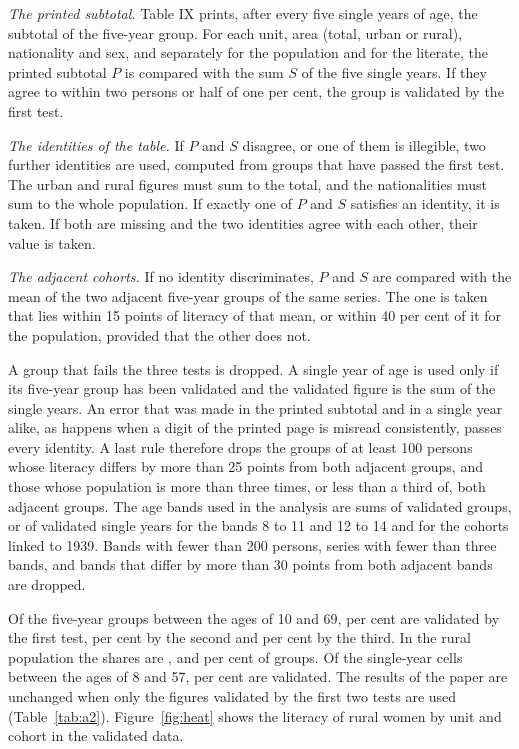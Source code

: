\emph{The printed subtotal.} Table IX prints, after every five single years of age, the subtotal of the five-year group. For each unit, area (total, urban or rural), nationality and sex, and separately for the population and for the literate, the printed subtotal $P$ is compared with the sum $S$ of the five single years. If they agree to within two persons or half of one per cent, the group is validated by the first test.

\emph{The identities of the table.} If $P$ and $S$ disagree, or one of them is illegible, two further identities are used, computed from groups that have passed the first test. The urban and rural figures must sum to the total, and the nationalities must sum to the whole population. If exactly one of $P$ and $S$ satisfies an identity, it is taken. If both are missing and the two identities agree with each other, their value is taken.

\emph{The adjacent cohorts.} If no identity discriminates, $P$ and $S$ are compared with the mean of the two adjacent five-year groups of the same series. The one is taken that lies within 15 points of literacy of that mean, or within 40 per cent of it for the population, provided that the other does not.

A group that fails the three tests is dropped. A single year of age is used only if its five-year group has been validated and the validated figure is the sum of the single years. An error that was made in the printed subtotal and in a single year alike, as happens when a digit of the printed page is misread consistently, passes every identity. A last rule therefore drops the groups of at least 100 persons whose literacy differs by more than 25 points from both adjacent groups, and those whose population is more than three times, or less than a third of, both adjacent groups. The age bands used in the analysis are sums of validated groups, or of validated single years for the bands 8 to 11 and 12 to 14 and for the cohorts linked to 1939. Bands with fewer than 200 persons, series with fewer than three bands, and bands that differ by more than 30 points from both adjacent bands are dropped.

Of the  five-year groups between the ages of 10 and 69,  per cent are validated by the first test,  per cent by the second and  per cent by the third. In the rural population the shares are ,  and  per cent of  groups. Of the  single-year cells between the ages of 8 and 57,  per cent are validated. The results of the paper are unchanged when only the figures validated by the first two tests are used (Table~\ref{tab:a2}). Figure~\ref{fig:heat} shows the literacy of rural women by unit and cohort in the validated data.

